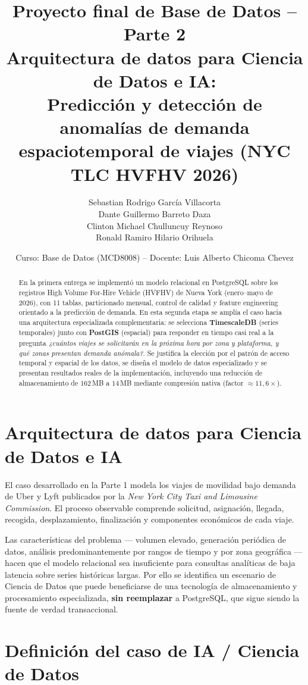\documentclass[11pt,a4paper]{article}
\title{\textbf{Proyecto final de Base de Datos -- Parte 2}\\[0.3em]
\Large Arquitectura de datos para Ciencia de Datos e IA:\\[0.2em]
Predicción y detección de anomalías de demanda espaciotemporal de viajes (NYC TLC HVFHV 2026)}
\author{%
  Sebastian Rodrigo García Villacorta\\
  Dante Guillermo Barreto Daza\\
  Clinton Michael Chulluncuy Reynoso\\
  Ronald Ramiro Hilario Orihuela}
\date{Curso: Base de Datos (MCD8008) -- Docente: Luis Alberto Chicoma Chevez}
\begin{document}
\maketitle

\begin{abstract}
En la primera entrega se implementó un modelo relacional en PostgreSQL sobre los registros
High Volume For-Hire Vehicle (HVFHV) de Nueva York (enero--mayo de 2026), con 11 tablas,
particionado mensual, control de calidad y feature engineering orientado a la predicción de
demanda. En esta segunda etapa se amplía el caso hacia una arquitectura especializada
complementaria: se selecciona \textbf{TimescaleDB} (series temporales) junto con
\textbf{PostGIS} (espacial) para responder en tiempo casi real a la pregunta
\emph{¿cuántos viajes se solicitarán en la próxima hora por zona y plataforma, y qué zonas
presentan demanda anómala?}. Se justifica la elección por el patrón de acceso temporal y
espacial de los datos, se diseña el modelo de datos especializado y se presentan resultados
reales de la implementación, incluyendo una reducción de almacenamiento de $162$\,MB a
$14$\,MB mediante compresión nativa (factor $\approx 11{,}6\times$).
\end{abstract}

\tableofcontents
\newpage

\section{Arquitectura de datos para Ciencia de Datos e IA}

El caso desarrollado en la Parte 1 modela los viajes de movilidad bajo demanda de Uber y Lyft
publicados por la \emph{New York City Taxi and Limousine Commission}. El proceso observable
comprende solicitud, asignación, llegada, recogida, desplazamiento, finalización y componentes
económicos de cada viaje.

Las características del problema --- volumen elevado, generación periódica de datos, análisis
predominantemente por rangos de tiempo y por zona geográfica --- hacen que el modelo
relacional sea insuficiente para consultas analíticas de baja latencia sobre series históricas
largas. Por ello se identifica un escenario de Ciencia de Datos que puede beneficiarse de una
tecnología de almacenamiento y procesamiento especializada, \textbf{sin reemplazar} a
PostgreSQL, que sigue siendo la fuente de verdad transaccional.

\section{Definición del caso de IA / Ciencia de Datos}
\end{document}
